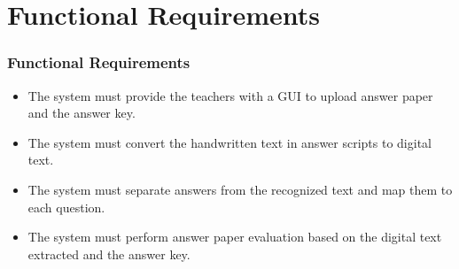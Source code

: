 \section{Functional Requirements}
\begin{frame}
\frametitle{Functional Requirements}
\begin{itemize}
    \item The system must provide the teachers with a GUI to
    upload answer paper and the answer key.
    \item The system must convert the handwritten text in 
    answer scripts to digital text.
    \item The system must separate answers from the recognized
    text and map them to each question.
    \item The system must perform answer paper evaluation
    based on the digital text extracted and the answer key.
\end{itemize}
\end{frame}
